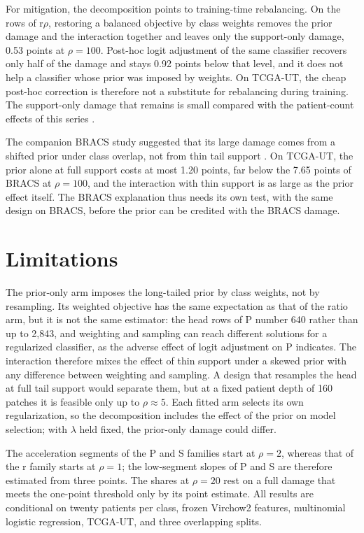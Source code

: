 For mitigation, the decomposition points to training-time rebalancing. On the rows of r$\rho$, restoring a balanced objective by class weights removes the prior damage and the interaction together and leaves only the support-only damage, 0.53 points at $\rho=100$. Post-hoc logit adjustment of the same classifier recovers only half of the damage and stays 0.92 points below that level, and it does not help a classifier whose prior was imposed by weights. On TCGA-UT, the cheap post-hoc correction is therefore not a substitute for rebalancing during training. The support-only damage that remains is small compared with the patient-count effects of this series \citep{queisler2026centreError}.

The companion BRACS study suggested that its large damage comes from a shifted prior under class overlap, not from thin tail support \citep{queisler2026prevalenceBracs}. On TCGA-UT, the prior alone at full support costs at most 1.20 points, far below the 7.65 points of BRACS at $\rho=100$, and the interaction with thin support is as large as the prior effect itself. The BRACS explanation thus needs its own test, with the same design on BRACS, before the prior can be credited with the BRACS damage.

\section{Limitations}
\label{sec:limitations}
The prior-only arm imposes the long-tailed prior by class weights, not by resampling. Its weighted objective has the same expectation as that of the ratio arm, but it is not the same estimator: the head rows of P number 640 rather than up to 2,843, and weighting and sampling can reach different solutions for a regularized classifier, as the adverse effect of logit adjustment on P indicates. The interaction therefore mixes the effect of thin support under a skewed prior with any difference between weighting and sampling. A design that resamples the head at full tail support would separate them, but at a fixed patient depth of 160 patches it is feasible only up to $\rho\approx5$. Each fitted arm selects its own regularization, so the decomposition includes the effect of the prior on model selection; with $\lambda$ held fixed, the prior-only damage could differ.

The acceleration segments of the P and S families start at $\rho=2$, whereas that of the r family starts at $\rho=1$; the low-segment slopes of P and S are therefore estimated from three points. The shares at $\rho=20$ rest on a full damage that meets the one-point threshold only by its point estimate. All results are conditional on twenty patients per class, frozen Virchow2 features, multinomial logistic regression, TCGA-UT, and three overlapping splits.
